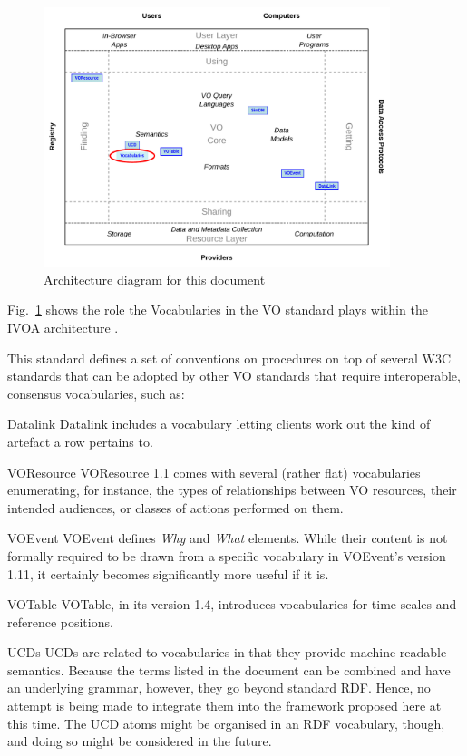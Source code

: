 \documentclass[11pt,a4paper]{ivoa}
\begin{document}
\begin{figure}
\centering

\includegraphics[width=0.9\textwidth]{role_diagram.pdf}
\caption{Architecture diagram for this document}
\label{fig:archdiag}
\end{figure}

Fig.~\ref{fig:archdiag} shows the role the Vocabularies in the VO standard
plays within the IVOA architecture \citep{2021ivoa.spec.1101D}.

This standard defines a set of conventions on procedures on
top of several W3C standards that can be adopted by other VO standards
that require interoperable, consensus vocabularies, such as:

\begin{bigdescription}
\item[Datalink \citep{2015ivoa.spec.0617D}] Datalink includes a
vocabulary letting clients work out the kind of artefact a row pertains
to.

\item[VOResource \citep{2018ivoa.spec.0625P}] VOResource 1.1 comes with
several (rather flat) vocabularies enumerating, for instance, the types
of relationships between VO resources, their intended audiences, or
classes of actions performed on them.

\item[VOEvent \citep{2011ivoa.spec.0711S}] VOEvent defines \emph{Why}
and \emph{What} elements.  While their content is not formally required
to be drawn from a specific vocabulary in VOEvent's version
1.11, it certainly becomes significantly more useful if it is.

\item[VOTable \citep{2019ivoa.spec.1021O}] VOTable, in its version 1.4,
introduces vocabularies for time scales and reference positions.


\item[UCDs \citep{2005ivoa.spec.0819D}] UCDs are related to vocabularies in
that they provide machine-readable semantics.  Because the terms listed
in the document can be combined and have an underlying grammar, however,
they go beyond standard RDF.  Hence, no attempt is being made to
integrate them into the framework proposed here at this time.  The
UCD atoms might be organised in an RDF vocabulary, though, and doing so
might be considered in the future.
\end{bigdescription}
\end{document}
